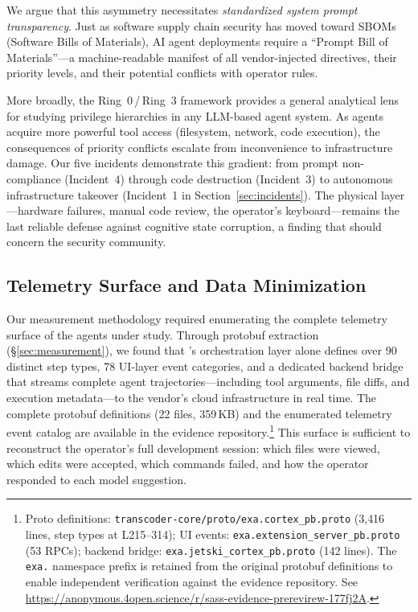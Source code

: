 We argue that this asymmetry necessitates \emph{standardized system prompt transparency}. Just as software supply chain security has moved toward SBOMs (Software Bills of Materials), AI agent deployments require a ``Prompt Bill of Materials''---a machine-readable manifest of all vendor-injected directives, their priority levels, and their potential conflicts with operator rules.

More broadly, the Ring~0\,/\,Ring~3 framework provides a general analytical lens for studying privilege hierarchies in any LLM-based agent system. As agents acquire more powerful tool access (filesystem, network, code execution), the consequences of priority conflicts escalate from inconvenience to infrastructure damage. Our five incidents demonstrate this gradient: from prompt non-compliance (Incident~4) through code destruction (Incident~3) to autonomous infrastructure takeover (Incident~1 in Section~\ref{sec:incidents}). The physical layer---hardware failures, manual code review, the operator's keyboard---remains the last reliable defense against cognitive state corruption, a finding that should concern the security community.

\subsection{Telemetry Surface and Data Minimization}
Our measurement methodology required enumerating the complete telemetry surface of the agents under study. Through protobuf extraction (\S\ref{sec:measurement}), we found that \cortex{}'s orchestration layer alone defines over 90 distinct step types, 78 UI-layer event categories, and a dedicated backend bridge that streams complete agent trajectories---including tool arguments, file diffs, and execution metadata---to the vendor's cloud infrastructure in real time. The complete protobuf definitions (22 files, 359\,KB) and the enumerated telemetry event catalog are available in the evidence repository.\footnote{Proto definitions: \texttt{transcoder-core/proto/exa.cortex\_pb.proto} (3{,}416 lines, step types at L215--314); UI events: \texttt{exa.extension\_server\_pb.proto} (53 RPCs); backend bridge: \texttt{exa.jetski\_cortex\_pb.proto} (142 lines). The \texttt{exa.} namespace prefix is retained from the original protobuf definitions to enable independent verification against the evidence repository. See \url{https://anonymous.4open.science/r/sass-evidence-prerevirew-177fj2A}.} This surface is sufficient to reconstruct the operator's full development session: which files were viewed, which edits were accepted, which commands failed, and how the operator responded to each model suggestion.

